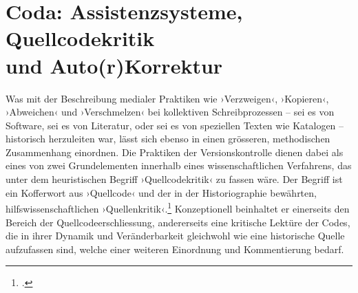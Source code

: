 \documentclass[a4paper,10pt]{article}
\newcommand{\inanf}[1]{›#1‹}
\begin{document}
\begin{comment}
(Git's recursive merge implementation also handles other awkward cases, like a file being modified in one version and renamed in the other, but those are extensions to its three-way merge implementation; not part of the technique for finding three versions to merge.)

Recursive three-way merge can only be used in situations where the tool has knowledge about the total ancestry directed acyclic graph (DAG) of the derivatives to be merged. Consequently, it cannot be used in situations where derivatives or merges do not fully specify their parent(s).

\end{comment}


\section{Coda: Assistenzsysteme, Quellcodekritik\\ und Auto(r)Korrektur}

Was mit der Beschreibung medialer Praktiken wie \inanf{Verzweigen}, \inanf{Kopieren}, \inanf{Abweichen} und \inanf{Verschmelzen} bei kollektiven Schreibprozessen – sei es von Software, sei es von Literatur, oder sei es von speziellen Texten wie Katalogen – historisch herzuleiten war, lässt sich ebenso in einen grösseren, methodischen Zusammenhang einordnen. Die Praktiken der Versionskontrolle dienen dabei als eines von zwei Grundelementen innerhalb eines wissenschaftlichen Verfahrens, das unter dem heuristischen Begriff \inanf{Quellcodekritik} zu fassen wäre. Der Begriff ist ein Kofferwort aus \inanf{Quellcode} und der in der Historiographie bewährten, hilfswissenschaftlichen \inanf{Quellenkritik}.\footcite[Vgl. dazu z.B.][376 ff.]{saxer:2014} Konzeptionell beinhaltet er einerseits den Bereich der Quellcodeerschliessung, andererseits eine kritische Lektüre der Codes, die in ihrer Dynamik und Veränderbarkeit gleichwohl wie eine historische Quelle aufzufassen sind, welche einer weiteren Einordnung und Kommentierung bedarf.  
\end{document}
